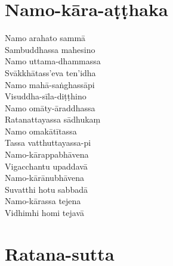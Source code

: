 \clearpage

\chapter{Namo-kāra-aṭṭhaka}%


\begin{paritta}
Namo arahato sammā\\
Sambuddhassa mahesino\\
Namo uttama-dhammassa\\
Svākkhātass'eva ten'idha\\
Namo mahā-saṅghassāpi\\
Visuddha-sīla-diṭṭhino\\
Namo omāty-āraddhassa\\
Ratanattayassa sādhukaṃ\\
Namo omakātītassa\\
Tassa vatthuttayassa-pi\\
Namo-kārappabhāvena\\
Vigacchantu upaddavā\\
Namo-kārānubhāvena\\
Suvatthi hotu sabbadā\\
Namo-kārassa tejena\\
Vidhimhi homi tejavā\\
\end{paritta}

\clearpage

\chapter{Ratana-sutta}%


